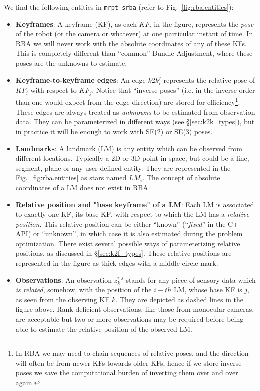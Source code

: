 \documentclass[a4paper,11pt]{article}
\begin{document}
We find the following entities in \texttt{mrpt-srba} (refer to Fig.~\ref{fig:rba.entities}):

\begin{itemize}
\item{\textbf{Keyframes}: A keyframe (KF), as each $KF_i$ in the figure, represents the \emph{pose} of the robot (or the 
camera or whatever) at one  particular instant of time. In RBA we will never work with the absolute coordinates of any of 
these KFs. This is completely different than ``common'' Bundle Adjustment, where these poses are the unknowns to 
estimate.
}
\item{\textbf{Keyframe-to-keyframe edges}: An edge $k2k_i^j$ represents the relative pose of $KF_i$ with respect to 
$KF_j$. Notice that ``inverse poses'' (i.e. in the inverse order than one would expect from the edge direction) are 
stored for efficiency\footnote{In RBA we may need to chain sequences of relative poses, and the direction will often 
be from newer KFs towards older KFs, hence if we store inverse poses we save the computational burden of inverting them 
over and over again.}. These edges are always treated as \emph{unknowns} to be estimated from observation data.
They can be parameterized in different ways (see \S\ref{sec:k2k_types}), but in practice it will be enough to work 
with SE(2) or SE(3) poses.
}
\item{\textbf{Landmarks}: A landmark (LM) is any entity which can be observed from different locations. Typically a 2D 
or 3D point in space, but could be a line, segment, plane or any user-defined entity. They are represented in 
the Fig.~\ref{fig:rba.entities} as stars named $LM_i$. The concept of absolute coordinates of a LM 
does not exist in RBA.
}
\item{\textbf{Relative position and "base keyframe" of a LM}: Each LM is associated to exactly one KF, its {base KF}, with 
respect to which the LM has a \emph{relative position}. This relative position can be either ``known'' (``\emph{fixed}'' 
in the C++ API) or ``unknown'', in which case it is also estimated during the problem optimization. There exist several 
possible ways of parameterizing relative positions, as discussed in \S\ref{sec:k2f_types}. These relative positions are 
represented in the figure as thick edges with a middle circle mark.
}
\item{\textbf{Observations}: An observation $z^{i,j}_k$ stands for any piece of sensory data which \emph{is related}, 
somehow, with the position of the $i-th$ LM, whose base KF is $j$, as seen from the observing KF $k$. They are 
depicted as dashed lines in the figure above. Rank-deficient observations, like those from monocular cameras, are 
acceptable but two or more observations may be required before being able to estimate the relative position of the 
observed LM.
}
\end{itemize}
\end{document}
